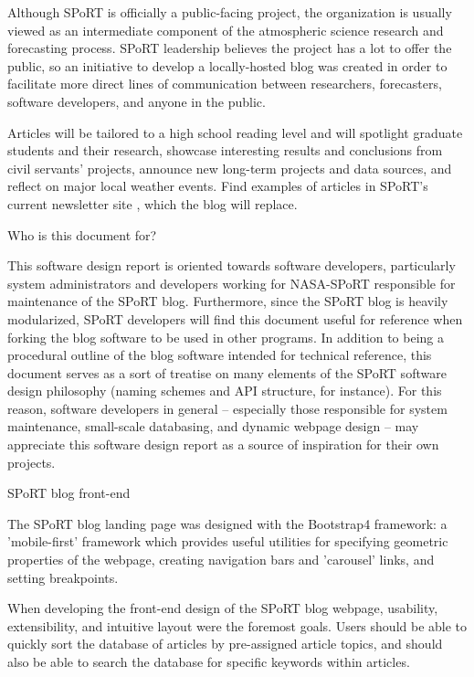 Although SPoRT is officially a public-facing project, the organization is usually viewed as an intermediate component of the atmospheric science research and forecasting process. SPoRT leadership believes the project has a lot to offer the public, so an initiative to develop a locally-hosted blog was created in order to facilitate more direct lines of communication between researchers, forecasters, software developers, and anyone in the public.

Articles will be tailored to a high school reading level and will spotlight graduate students and their research, showcase interesting results and conclusions from civil servants' projects, announce new long-term projects and data sources, and reflect on major local weather events. Find examples of articles in SPoRT's current newsletter site \cite{sportnewsletter20}, which the blog will replace.

Who is this document for?

This software design report is oriented towards software developers, particularly system administrators and developers working for NASA-SPoRT responsible for maintenance of the SPoRT blog. Furthermore, since the SPoRT blog is heavily modularized, SPoRT developers will find this document useful for reference when forking the blog software to be used in other programs. In addition to being a procedural outline of the blog software intended for technical reference, this document serves as a sort of treatise on many elements of the SPoRT software design philosophy (naming schemes and API structure, for instance). For this reason, software developers in general -- especially those responsible for system maintenance, small-scale databasing, and dynamic webpage design -- may appreciate this software design report as a source of inspiration for their own projects.

SPoRT blog front-end

The SPoRT blog landing page was designed with the Bootstrap4 framework: a 'mobile-first' framework which provides useful utilities for specifying geometric properties of the webpage, creating navigation bars and 'carousel' links, and setting breakpoints.

When developing the front-end design of the SPoRT blog webpage, usability, extensibility, and intuitive layout were the foremost goals. Users should be able to quickly sort the database of articles by pre-assigned article topics, and should also be able to search the database for specific keywords within articles.

